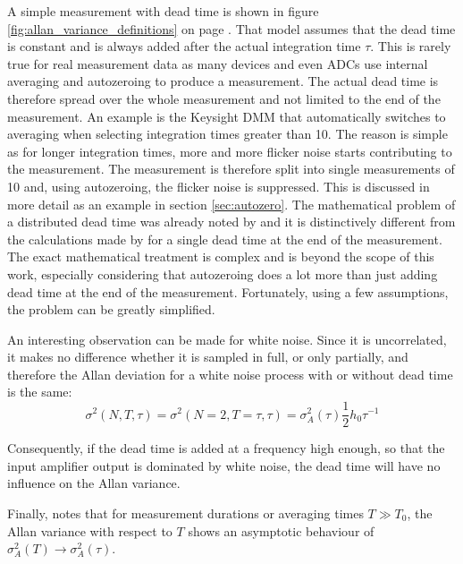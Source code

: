 A simple measurement with dead time is shown in figure \ref{fig:allan_variance_definitions} on page \pageref{fig:allan_variance_definitions}. That model assumes that the dead time is constant and is always added after the actual integration time $\tau$. This is rarely true for real measurement data as many devices and even ADCs use internal averaging and autozeroing to produce a measurement. The actual dead time is therefore spread over the whole measurement and not limited to the end of the measurement. An example is the Keysight  DMM that automatically switches to averaging when selecting integration times greater than \qty{10}{\plc}. The reason is simple as for longer integration times, more and more flicker noise starts contributing to the measurement. The measurement is therefore split into single measurements of \qty{10}{\plc} and, using autozeroing, the flicker noise is suppressed. This is discussed in more detail as an example in section \ref{sec:autozero}. The mathematical problem of a distributed dead time was already noted by \citeauthor{adev_noise_types} \cite{adev_noise_types} and it is distinctively different from the calculations made by \citeauthor{psd_to_adev} \cite{psd_to_adev} for a single dead time at the end of the measurement. The exact mathematical treatment is complex and is beyond the scope of this work, especially considering that autozeroing does a lot more than just adding dead time at the end of the measurement. Fortunately, using a few assumptions, the problem can be greatly simplified.

An interesting observation can be made for white noise. Since it is uncorrelated, it makes no difference whether it is sampled in full, or only partially, and therefore the Allan deviation for a white noise process with or without dead time is the same:
\begin{equation}
    \sigma^2(N,T, \tau) = \sigma^2(N=2,T=\tau, \tau) = \sigma_A^2(\tau) \frac 1 2 h_0 \tau^{-1}
\end{equation}

Consequently, if the dead time is added at a frequency high enough, so that the input amplifier output is dominated by white noise, the dead time will have no influence on the Allan variance.

Finally, \citeauthor{psd_to_adev} \cite{psd_to_adev} notes that for measurement durations or averaging times $T \gg T_0$, the Allan variance with respect to $T$ shows an asymptotic behaviour of $\sigma_A^2(T) \to \sigma_A^2(\tau)$.

